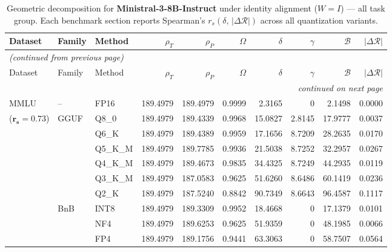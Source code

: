 \begingroup
\small
\setlength{\tabcolsep}{4pt}
\renewcommand{\arraystretch}{1.05}
\setlength{\LTcapwidth}{\textwidth}
\begin{longtable}{ll l rrrrrrr}
\caption{Geometric decomposition for \textbf{Ministral-3-8B-Instruct} under identity alignment ($W{=}I$) --- all task group. Each benchmark section reports Spearman's $r_s(\delta,\,|\Delta\mathcal{R}|)$ across all quantization variants.}\label{tab:mistral_instruct_decomposition_all}\\
\toprule
Dataset & Family & Method & $\rho_T$ & $\rho_P$ & $\Omega$ & $\delta$ & $\gamma$ & $\mathcal{B}$ & $|\Delta\mathcal{R}|$ \\
\midrule
\endfirsthead
\multicolumn{10}{l}{\small\itshape (continued from previous page)}\\
\toprule
Dataset & Family & Method & $\rho_T$ & $\rho_P$ & $\Omega$ & $\delta$ & $\gamma$ & $\mathcal{B}$ & $|\Delta\mathcal{R}|$ \\
\midrule
\endhead
\midrule
\multicolumn{10}{r}{\small\itshape continued on next page}\\
\endfoot
\bottomrule
\endlastfoot
MMLU & -- & FP16 & 189.4979 & 189.4979 & 0.9999 & 2.3165 & \cellcolor{cyan!12} $0$ & 2.1498 & 0.0000 \\
{\small ($\mathbf{r_s{=}0.73}$)} & GGUF & Q8\_0 & 189.4979 & 189.4339 & 0.9968 & 15.0827 & 2.8145 & 17.9777 & 0.0037 \\
 &  & Q6\_K & 189.4979 & 189.4389 & 0.9959 & 17.1656 & 8.7209 & 28.2635 & 0.0170 \\
 &  & Q5\_K\_M & 189.4979 & 189.7785 & 0.9936 & 21.5038 & 8.7252 & 32.2957 & 0.0267 \\
 &  & Q4\_K\_M & 189.4979 & 189.4673 & 0.9835 & 34.4325 & 8.7249 & 44.2935 & 0.0119 \\
 &  & Q3\_K\_M & 189.4979 & 187.0583 & 0.9625 & 51.6260 & 8.6486 & 60.1419 & 0.0236 \\
 &  & Q2\_K & 189.4979 & 187.5240 & \cellcolor{red!18} 0.8842 & \cellcolor{red!18} 90.7349 & 8.6643 & \cellcolor{red!18} 96.4587 & \cellcolor{red!18} 0.1117 \\
 & BnB & INT8 & 189.4979 & 189.3309 & 0.9952 & 18.4668 & \cellcolor{cyan!12} $0$ & 17.1379 & 0.0101 \\
 &  & NF4 & 189.4979 & 189.6253 & 0.9625 & 51.9359 & \cellcolor{cyan!12} $0$ & 48.1985 & 0.0066 \\
 &  & FP4 & 189.4979 & 189.1756 & \cellcolor{red!18} 0.9441 & \cellcolor{red!18} 63.3063 & \cellcolor{cyan!12} $0$ & \cellcolor{red!18} 58.7507 & \cellcolor{red!18} 0.0564 \\

\end{longtable}

